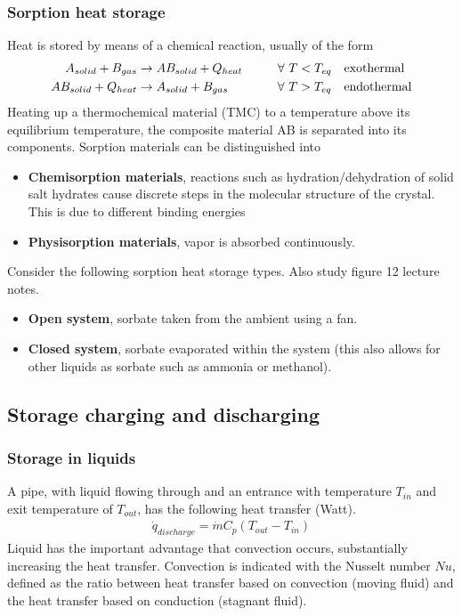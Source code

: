 \documentclass[a4paper,10pt]{article}
\begin{document}
\subsubsection{Sorption heat storage}
Heat is stored by means of a chemical reaction, usually of the form
\begin{align}
 A_{solid} + B_{gas} &\rightarrow AB_{solid} + Q_{heat} \hspace{1cm} \forall \ T<T_{eq} \ \ \ \text{exothermal}\\
 AB_{solid} + Q_{heat} &\rightarrow A_{solid} + B_{gas} \hspace{1.4cm} \forall \ T>T_{eq} \ \ \ \text{endothermal}
\end{align}
Heating up a thermochemical material (TMC) to a temperature above its equilibrium temperature, the composite material AB is separated into its components. Sorption materials can be distinguished into
\begin{itemize}
 \item \textbf{Chemisorption materials}, reactions such as hydration/dehydration of solid salt hydrates cause discrete steps in the molecular structure of the crystal. This is due to different binding energies
 \item \textbf{Physisorption materials}, vapor is absorbed continuously.
\end{itemize}
Consider the following sorption heat storage types. Also study figure 12 lecture notes.
\begin{itemize}
 \item \textbf{Open system}, sorbate taken from the ambient using a fan.
 \item \textbf{Closed system}, sorbate evaporated within the system (this also allows for other liquids as sorbate such as ammonia or methanol).
\end{itemize}


\subsection{Storage charging and discharging}

\subsubsection{Storage in liquids}
A pipe, with liquid flowing through and an entrance with temperature $T_{in}$ and exit temperature of $T_{out}$, has the following heat transfer (Watt).
\begin{align}
 \dot{q}_{discharge} = \dot{m} C_p (T_{out} - T_{in})
\end{align}
Liquid has the important advantage that convection occurs, substantially increasing the heat transfer. Convection is indicated with the Nusselt number $Nu$, defined as the ratio between heat transfer based on convection (moving fluid) and the heat transfer based on conduction (stagnant fluid). \bigskip
\end{document}
